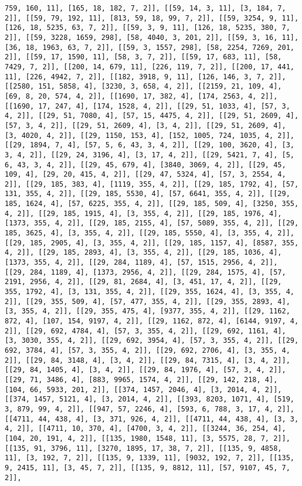 \documentclass[12pt,fleqn]{article}\usepackage{../../common}
\begin{document}
\begin{verbatim}
759, 160, 11], [165, 18, 182, 7, 2]], [[59, 14, 3, 11], [3, 184, 7, 2]], [[59, 79, 192, 11], [813, 59, 18, 99, 7, 2]], [[59, 3254, 9, 11], [126, 18, 5235, 63, 7, 2]], [[59, 3, 9, 11], [126, 18, 5235, 380, 7, 2]], [[59, 3228, 1659, 298], [58, 4040, 3, 201, 2]], [[59, 3, 16, 11], [36, 18, 1963, 63, 7, 2]], [[59, 3, 1557, 298], [58, 2254, 7269, 201, 2]], [[59, 17, 1590, 11], [58, 3, 7, 2]], [[59, 17, 683, 11], [58, 7429, 7, 2]], [[200, 14, 679, 11], [226, 119, 7, 2]], [[200, 17, 441, 11], [226, 4942, 7, 2]], [[182, 3918, 9, 11], [126, 146, 3, 7, 2]], [[2580, 151, 5858, 4], [3230, 3, 658, 4, 2]], [[2159, 21, 109, 4], [69, 8, 20, 574, 4, 2]], [[1690, 17, 382, 4], [174, 2563, 4, 2]], [[1690, 17, 247, 4], [174, 1528, 4, 2]], [[29, 51, 1033, 4], [57, 3, 4, 2]], [[29, 51, 7080, 4], [57, 15, 4475, 4, 2]], [[29, 51, 2609, 4], [57, 3, 4, 2]], [[29, 51, 2609, 4], [3, 4, 2]], [[29, 51, 2609, 4], [3, 4020, 4, 2]], [[29, 1150, 153, 4], [152, 1005, 724, 1035, 4, 2]], [[29, 1894, 7, 4], [57, 5, 6, 43, 3, 4, 2]], [[29, 100, 3620, 4], [3, 3, 4, 2]], [[29, 24, 3196, 4], [3, 17, 4, 2]], [[29, 5421, 7, 4], [5, 6, 43, 3, 4, 2]], [[29, 45, 679, 4], [3840, 3069, 4, 2]], [[29, 45, 109, 4], [29, 20, 415, 4, 2]], [[29, 47, 5324, 4], [57, 3, 2554, 4, 2]], [[29, 185, 383, 4], [1119, 355, 4, 2]], [[29, 185, 1792, 4], [57, 131, 355, 4, 2]], [[29, 185, 5530, 4], [57, 6641, 355, 4, 2]], [[29, 185, 1624, 4], [57, 6225, 355, 4, 2]], [[29, 185, 509, 4], [3250, 355, 4, 2]], [[29, 185, 1915, 4], [3, 355, 4, 2]], [[29, 185, 1976, 4], [1373, 355, 4, 2]], [[29, 185, 2155, 4], [57, 5089, 355, 4, 2]], [[29, 185, 3625, 4], [3, 355, 4, 2]], [[29, 185, 5550, 4], [3, 355, 4, 2]], [[29, 185, 2905, 4], [3, 355, 4, 2]], [[29, 185, 1157, 4], [8587, 355, 4, 2]], [[29, 185, 2893, 4], [3, 355, 4, 2]], [[29, 185, 1036, 4], [1373, 355, 4, 2]], [[29, 284, 1189, 4], [57, 1515, 2956, 4, 2]], [[29, 284, 1189, 4], [1373, 2956, 4, 2]], [[29, 284, 1575, 4], [57, 2191, 2956, 4, 2]], [[29, 81, 2684, 4], [3, 451, 17, 4, 2]], [[29, 355, 1792, 4], [3, 131, 355, 4, 2]], [[29, 355, 1624, 4], [3, 355, 4, 2]], [[29, 355, 509, 4], [57, 477, 355, 4, 2]], [[29, 355, 2893, 4], [3, 355, 4, 2]], [[29, 355, 475, 4], [9377, 355, 4, 2]], [[29, 1162, 872, 4], [107, 154, 9197, 4, 2]], [[29, 1162, 872, 4], [6144, 9197, 4, 2]], [[29, 692, 4784, 4], [57, 3, 355, 4, 2]], [[29, 692, 1161, 4], [3, 3030, 355, 4, 2]], [[29, 692, 3954, 4], [57, 3, 355, 4, 2]], [[29, 692, 3784, 4], [57, 3, 355, 4, 2]], [[29, 692, 2706, 4], [3, 355, 4, 2]], [[29, 84, 3148, 4], [3, 4, 2]], [[29, 84, 7315, 4], [3, 4, 2]], [[29, 84, 1405, 4], [3, 4, 2]], [[29, 84, 1976, 4], [57, 3, 4, 2]], [[29, 71, 3486, 4], [883, 9965, 1574, 4, 2]], [[29, 142, 218, 4], [104, 66, 5933, 201, 2]], [[374, 1457, 2046, 4], [3, 2014, 4, 2]], [[374, 1457, 5121, 4], [3, 2014, 4, 2]], [[393, 8203, 1071, 4], [519, 3, 879, 99, 4, 2]], [[947, 57, 2246, 4], [593, 6, 788, 3, 17, 4, 2]], [[4711, 44, 438, 4], [3, 371, 926, 4, 2]], [[4711, 44, 438, 4], [3, 3, 4, 2]], [[4711, 10, 370, 4], [4700, 3, 4, 2]], [[3244, 36, 254, 4], [104, 20, 191, 4, 2]], [[135, 1980, 1548, 11], [3, 5575, 28, 7, 2]], [[135, 91, 3796, 11], [3270, 1895, 17, 38, 7, 2]], [[135, 9, 4858, 11], [3, 192, 7, 2]], [[135, 9, 1339, 11], [9032, 192, 7, 2]], [[135, 9, 2415, 11], [3, 45, 7, 2]], [[135, 9, 8812, 11], [57, 9107, 45, 7, 2]], 
\end{verbatim}
\end{document}
